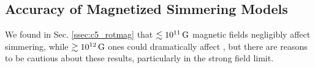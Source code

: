 
\subsection{Accuracy of Magnetized Simmering Models}
\label{ssec:c5_magaccuracy}

We found in Sec. \ref{ssec:c5_rotmag} that $\lesssim10^{11}\,\mathrm{G}$ magnetic fields negligibly affect simmering, while $\gtrsim10^{12}\,\mathrm{G}$ ones could dramatically affect \vconv, but there are reasons to be cautious about these results, particularly in the strong field limit.

